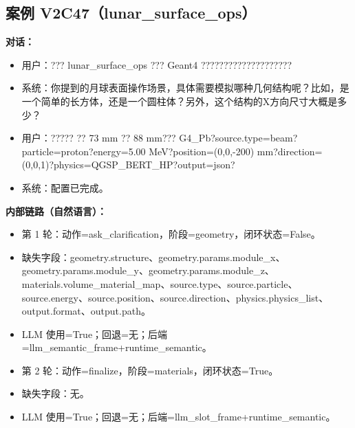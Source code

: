 \documentclass[11pt]{ctexart}
\begin{document}
\subsection{案例 V2C47（lunar\_surface\_ops）}
\textbf{对话：}
\begin{itemize}
\item 用户：??? lunar\_surface\_ops ??? Geant4 ????????????????????
\item 系统：你提到的月球表面操作场景，具体需要模拟哪种几何结构呢？比如，是一个简单的长方体，还是一个圆柱体？另外，这个结构的X方向尺寸大概是多少？
\item 用户：????? ?? 73 mm ?? 88 mm??? G4\_Pb?source.type=beam?particle=proton?energy=5.00 MeV?position=(0,0,-200) mm?direction=(0,0,1)?physics=QGSP\_BERT\_HP?output=json?
\item 系统：配置已完成。
\end{itemize}
\textbf{内部链路（自然语言）：}
\begin{itemize}
\item 第 1 轮：动作=ask\_clarification，阶段=geometry，闭环状态=False。
\item 缺失字段：geometry.structure、geometry.params.module\_x、geometry.params.module\_y、geometry.params.module\_z、materials.volume\_material\_map、source.type、source.particle、source.energy、source.position、source.direction、physics.physics\_list、output.format、output.path。
\item LLM 使用=True；回退=无；后端=llm\_semantic\_frame+runtime\_semantic。
\item 第 2 轮：动作=finalize，阶段=materials，闭环状态=True。
\item 缺失字段：无。
\item LLM 使用=True；回退=无；后端=llm\_slot\_frame+runtime\_semantic。
\end{itemize}
\end{document}
